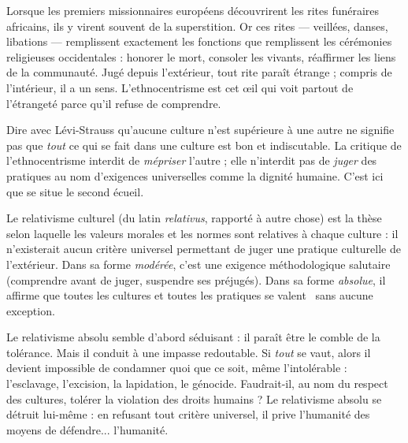 \documentclass[11pt]{article}
\newcommand{\cle}[1]{{\popxbold\color{popdark}#1}}
\newcounter{popsec}
\newcounter{popsub}
\newcommand{\courssub}[1]{%
  \stepcounter{popsub}%
  \par\vspace{9pt}\noindent{\popxbold\fontsize{11.5}{13}\selectfont\color{popink}{\color{poporange}\thepopsec.\thepopsub}\hspace{6pt}#1}\par\nopagebreak\vspace{4pt}
}
\begin{document}
\begin{exemplebox}
Lorsque les premiers missionnaires européens découvrirent les rites funéraires africains, ils y virent souvent de la superstition. Or ces rites — veillées, danses, libations — remplissent exactement les fonctions que remplissent les cérémonies religieuses occidentales : honorer le mort, consoler les vivants, réaffirmer les liens de la communauté. Jugé depuis l'extérieur, tout rite paraît étrange ; compris de l'intérieur, il a un sens. L'ethnocentrisme est cet œil qui voit partout de l'étrangeté parce qu'il refuse de comprendre.
\end{exemplebox}

\begin{attention}
Dire avec Lévi-Strauss qu'aucune culture n'est supérieure à une autre ne signifie pas que \emph{tout} ce qui se fait dans une culture est bon et indiscutable. La critique de l'ethnocentrisme interdit de \emph{mépriser} l'autre ; elle n'interdit pas de \emph{juger} des pratiques au nom d'exigences universelles comme la dignité humaine. C'est ici que se situe le second écueil.
\end{attention}

\courssub{Second écueil : le relativisme absolu}

\begin{definition}
Le \cle{relativisme culturel} (du latin \emph{relativus}, rapporté à autre chose) est la thèse selon laquelle les valeurs morales et les normes sont relatives à chaque culture : il n'existerait aucun critère universel permettant de juger une pratique culturelle de l'extérieur. Dans sa forme \emph{modérée}, c'est une exigence méthodologique salutaire (comprendre avant de juger, suspendre ses préjugés). Dans sa forme \emph{absolue}, il affirme que toutes les cultures et toutes les pratiques \guillemotleft se valent \guillemotright\ sans aucune exception.
\end{definition}

Le relativisme absolu semble d'abord séduisant : il paraît être le comble de la tolérance. Mais il conduit à une impasse redoutable. Si \emph{tout} se vaut, alors il devient impossible de condamner quoi que ce soit, même l'intolérable : l'esclavage, l'excision, la lapidation, le génocide. Faudrait-il, au nom du respect des cultures, tolérer la violation des droits humains ? Le relativisme absolu se détruit lui-même : en refusant tout critère universel, il prive l'humanité des moyens de défendre... l'humanité.
\end{document}

